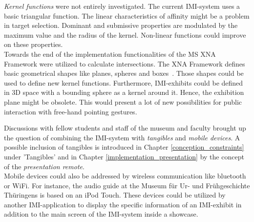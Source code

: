 \textit{Kernel functions} were not entirely investigated. The current \ac{IMI}-system uses a basic triangular function. The linear characteristics of affinity might be a problem in target selection. Dominant and submissive properties are modulated by the maximum value and the radius of the kernel. Non-linear functions could improve on these properties.
\\
Towards the end of the implementation functionalities of the \ac{MS} XNA Framework were utilized to calculate intersections. The XNA Framework defines basic geometrical shapes like planes, spheres and boxes~\cite{MSXNA}. Those shapes could be used to define new kernel functions. Furthermore, \ac{IMI}-exhibits could be defined in \ac{3D} space with a bounding sphere as a kernel around it. Hence, the exhibition plane might be obsolete. This would present a lot of new possibilities for public interaction with free-hand pointing gestures.

Discussions with fellow students and staff of the museum and faculty brought up the question of combining the \ac{IMI}-system with \textit{tangibles} and \textit{mobile devices}. A possible inclusion of tangibles is introduced in Chapter \ref{conception_constraints} under 'Tangibles' and in Chapter \ref{implementation_presentation} by the concept of the \textit{presentation remote}.
\\
Mobile devices could also be addressed by wireless communication like bluetooth or WiFi. For instance, the audio guide at the Museum für Ur- und Frühgeschichte Thüringens is based on an iPod Touch. These devices could be utilized by another \ac{IMI}-application to display the specific information of an \ac{IMI}-exhibit in addition to the main screen of the \ac{IMI}-system inside a showcase.

